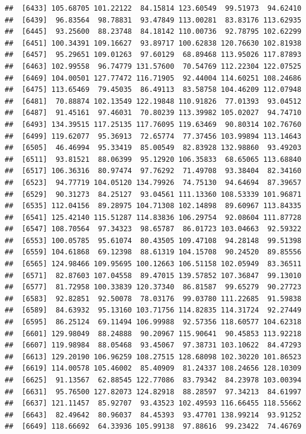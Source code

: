 \documentclass[
]{article}
\begin{document}
\begin{verbatim}
##  [6433] 105.68705 101.22122  84.15814 123.60549  99.51973  94.62410
##  [6439]  96.83564  98.78831  93.47849 113.00281  83.83176 113.62935
##  [6445]  93.25600  88.23748  84.18142 110.00736  92.78795 102.62299
##  [6451] 100.34391 109.16627  93.89717 100.62838 120.76630 102.81938
##  [6457]  95.29651 109.01263  97.60129  68.89468 113.95026 117.87893
##  [6463] 102.99558  96.74779 131.57600  70.54769 112.22304 122.07525
##  [6469] 104.00501 127.77472 116.71905  92.44004 114.60251 108.24686
##  [6475] 113.65469  79.45035  86.49113  83.58758 104.46209 112.07948
##  [6481]  70.88874 102.13549 122.19848 110.91826  77.01393  93.04512
##  [6487]  91.45161  97.46031  70.80239 113.39982 105.02027  94.74710
##  [6493] 134.39515 117.25135 117.76095 119.63469  90.80314 102.76760
##  [6499] 119.62077  95.36913  72.65774  77.37456 103.99894 113.14643
##  [6505]  46.46994  95.33419  85.00549  82.83928 132.98860  93.49203
##  [6511]  93.81521  88.06399  95.12920 106.35833  68.65065 113.68840
##  [6517] 106.36316  80.97474  97.76292  71.49708  93.38404  82.34160
##  [6523]  94.77719 104.05120 134.79926  74.75130  94.64694  87.39657
##  [6529]  90.31273  84.25127  93.04561 111.13360 108.53339 101.96871
##  [6535] 112.04156  89.28975 104.71308 102.14898  89.60967 113.84335
##  [6541] 125.42140 115.51287 114.83836 106.29754  92.08604 111.87728
##  [6547] 108.70564  97.34323  98.65787  86.01723 103.04663  92.59322
##  [6553] 100.05785  95.61074  80.43505 109.47108  94.28148  99.51398
##  [6559] 104.61868  69.12398  88.61319 104.15708  90.24520  89.85556
##  [6565] 124.98466 109.95695 100.12663 106.51158 102.05949  83.36511
##  [6571]  82.87603 107.04558  89.47015 139.57852 107.36847  99.13010
##  [6577]  81.72958 100.33839 120.37340  86.81587  99.65279  90.27723
##  [6583]  92.82851  92.50078  78.03176  99.03780 111.22685  91.59838
##  [6589]  84.63932  95.13160 103.71756 114.82835 114.31724  92.27449
##  [6595]  86.25124  69.11494 106.99988  92.57356 118.60577 104.62318
##  [6601] 129.98049  88.24888  90.20967 115.90641  90.45853 113.92218
##  [6607] 119.98984  88.05468  93.45067  97.38731 103.10622  84.47293
##  [6613] 129.20190 106.96259 108.27515 128.68098 102.30220 101.86523
##  [6619] 114.00578 105.46002  85.40909  81.24337 108.24656 128.10309
##  [6625]  91.13567  62.88545 122.77086  83.79342  84.23978 103.00394
##  [6631]  95.76500 127.82073 124.82918  88.28597  97.34213  84.61997
##  [6637] 121.11457  85.92707  93.43523 102.49593 116.66455 118.55662
##  [6643]  82.49642  80.96037  84.45393  93.47701 138.99214  93.91252
##  [6649] 118.66692  64.33936 105.99138  97.88616  99.23422  74.46769

\end{verbatim}
\end{document}
